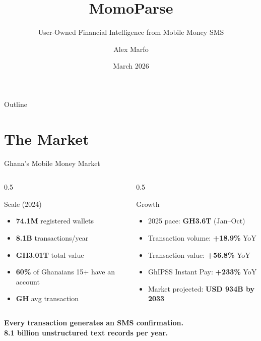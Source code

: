 \documentclass[aspectratio=169, 11pt]{beamer}
\title{MomoParse}
\subtitle{User-Owned Financial Intelligence from Mobile Money SMS}
\author{Alex Marfo}
\date{March 2026}
\begin{document}
\begin{frame}
\titlepage
\end{frame}

\begin{frame}{Outline}
\tableofcontents
\end{frame}

\section{The Market}

\begin{frame}{Ghana's Mobile Money Market}
\begin{columns}[T]
\begin{column}{0.5\textwidth}
\begin{block}{Scale (2024)}
\begin{itemize}
  \item \textbf{74.1M} registered wallets
  \item \textbf{8.1B} transactions/year
  \item \textbf{GH\textcent 3.01T} total value
  \item \textbf{60\%} of Ghanaians 15+ have an account
  \item \textbf{GH} avg transaction
\end{itemize}
\end{block}
\end{column}
\begin{column}{0.5\textwidth}
\begin{block}{Growth}
\begin{itemize}
  \item 2025 pace: \textbf{GH\textcent 3.6T} (Jan--Oct)
  \item Transaction volume: \textbf{+18.9\%} YoY
  \item Transaction value: \textbf{+56.8\%} YoY
  \item GhIPSS Instant Pay: \textbf{+233\%} YoY
  \item Market projected: \textbf{USD 934B by 2033}
\end{itemize}
\end{block}
\end{column}
\end{columns}

\vspace{0.5cm}
\centering
\textcolor{mpTeal}{\textbf{Every transaction generates an SMS confirmation.\\8.1 billion unstructured text records per year.}}
\end{frame}
\end{document}
